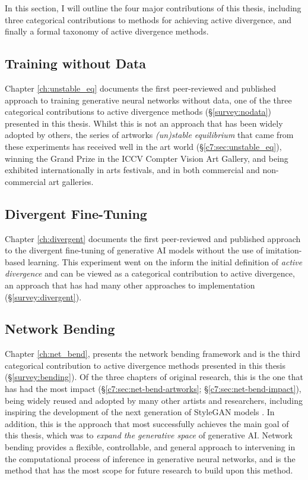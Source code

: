 In this section, I will outline the four major contributions of this thesis, including three categorical contributions to methods for achieving active divergence, and finally a formal taxonomy of active divergence methods.

\subsection{Training without Data}

Chapter \ref{ch:unstable_eq} documents the first peer-reviewed and published approach to training generative neural networks without data, one of the three categorical contributions to active divergence methods (\S \ref{survey:nodata}) presented in this thesis.
Whilst this is not an approach that has been widely adopted by others, the series of artworks \textit{(un)stable equilibrium} that came from these experiments has received well in the art world (\S \ref{c7:sec:unstable_eq}), winning the Grand Prize in the ICCV Compter Vision Art Gallery, and being exhibited internationally in arts festivals, and in both commercial and non-commercial art galleries. 

\subsection{Divergent Fine-Tuning}

Chapter \ref{ch:divergent} documents the first peer-reviewed and published approach to the divergent fine-tuning of generative AI models without the use of imitation-based learning.
This experiment went on the inform the initial definition of \textit{active divergence} \citep{berns2020bridging} and can be viewed as a categorical contribution to active divergence, an approach that has had many other approaches to implementation (\S \ref{survey:divergent}).


\subsection{Network Bending}

Chapter \ref{ch:net_bend}, presents the network bending framework and is the third categorical contribution to active divergence methods presented in this thesis (\S \ref{survey:bending}).
Of the three chapters of original research, this is the one that has had the most impact (\S \ref{c7:sec:net-bend-artworks}; \S \ref{c7:sec:net-bend-impact}), being widely reused and adopted by many other artists and researchers, including inspiring the development of the next generation of StyleGAN models \citep{karras2021alias}.
In addition, this is the approach that most successfully achieves the main goal of this thesis, which was to \textit{expand the generative space} of generative AI. 
Network bending provides a flexible, controllable, and general approach to intervening in the computational process of inference in generative neural networks, and is the method that has the most scope for future research to build upon this method.

